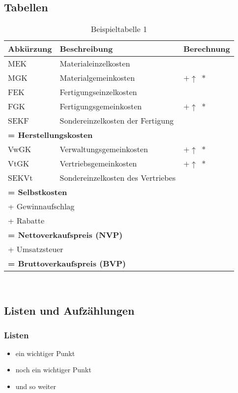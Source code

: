\subsection{Tabellen}
\begin{table}[H]
	\centering
	\begin{tabular}[ht]{|l|l|l|}
		\hline
		\textbf{Abkürzung} & \textbf{Beschreibung} & \textbf{Berechnung}\\
		\hline\hline
		MEK & Materialeinzelkosten & \\
		MGK & Materialgemeinkosten & $+ \uparrow$~*\\
		FEK & Fertigungseinzelkosten & \\
		FGK & Fertigungsgemeinkosten & $+ \uparrow$~*\\
		SEKF & Sondereinzelkosten der Fertigung & \\
		\hline\hline
		\multicolumn{3}{|l|}{\textbf{= Herstellungskosten}} \\
		\hline\hline
		VwGK & Verwaltungsgemeinkosten & $+ \uparrow$~*\\
		VtGK & Vertriebsgemeinkosten & $+ \uparrow$~*\\
		SEKVt & Sondereinzelkosten des Vertriebes & \\
		\hline\hline
		\multicolumn{3}{|l|}{\textbf{= Selbstkosten}} \\
		\hline\hline
		\multicolumn{3}{|l|}{+ Gewinnaufschlag} \\
		\multicolumn{3}{|l|}{+ Rabatte} \\
		\hline\hline
		\multicolumn{3}{|l|}{\textbf{= Nettoverkaufspreis (NVP)}} \\
		\hline
		\multicolumn{3}{|l|}{+ Umsatzsteuer} \\
		\hline\hline
		\multicolumn{3}{|l|}{\textbf{= Bruttoverkaufspreis (BVP)}} \\
		\hline
	\end{tabular} \\
	\caption{Beispieltabelle 1}
	\label{tbl:beispieltabelle2}
\end{table}

\subsection{Listen und Aufzählungen}
\subsubsection{Listen}
\begin{itemize}
\item ein wichtiger Punkt
\item noch ein wichtiger Punkt
\item und so weiter
\end{itemize}
